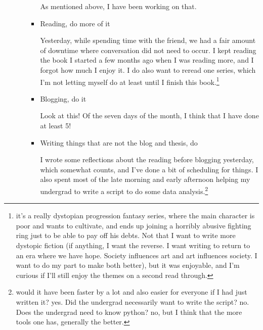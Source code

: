 \documentclass[12pt]{article}
\renewcommand{\,}{\textsuperscript{,}}
\begin{document}
\begin{itemize}
\begin{itemize}
\begin{itemize}
As mentioned above, I have been working on that.

\item Reading, do more of it

Yesterday, while spending time with the friend, we had a fair amount of downtime where conversation did not need to occur.  
I kept reading the book I started a few months ago when I was reading more, and I forgot how much I enjoy it.  
I do also want to reread one series, which I'm not letting myself do at least until I finish this book.\footnote{it's a really dystopian progression fantasy series, where the main character is poor and wants to cultivate, and ends up joining a horribly abusive fighting ring just to be able to pay off his debts.  
Not that I want to write more dystopic fiction (if anything, I want the reverse. I want writing to return to an era where we have hope. Society influences art and art influences society. I want to do my part to make both better), but it was enjoyable, and I'm curious if I'll still enjoy the themes on a second read through.}

\item Blogging, do it

Look at this! Of the seven days of the month, I think that I have done at least 5!

\item Writing things that are not the blog and thesis, do

I wrote some reflections about the reading before blogging yesterday, which somewhat counts, and I've done a bit of scheduling for things.  
I also spent most of the late morning and early afternoon helping my undergrad to write a script to do some data analysis.\footnote{would it have been faster by a lot and also easier for everyone if I had just written it? yes. Did the undergrad necessarily want to write the script? no. Does the undergrad need to know python? no, but I think that the more tools one has, generally the better.}

\end{itemize}

\end{itemize}

\end{itemize}
\end{document}
